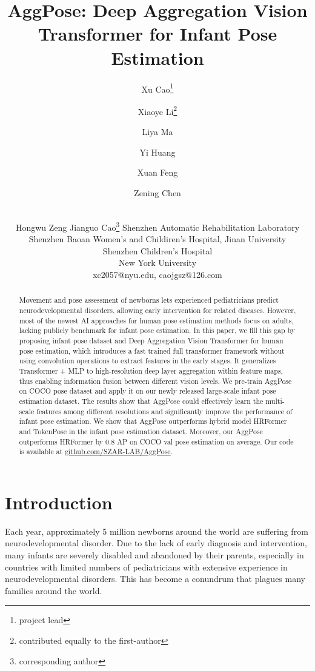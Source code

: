 \documentclass{article}
\title{AggPose: Deep Aggregation Vision Transformer for Infant Pose Estimation}
\author{
Xu Cao\thanks{project lead}
\and
Xiaoye Li\thanks{contributed equally to the first-author} \and
Liya Ma \and
Yi Huang \and
Xuan Feng \and
Zening Chen \and \\
Hongwu Zeng \And
Jianguo Cao\thanks{corresponding author}
\affiliations
Shenzhen Automatic Rehabilitation Laboratory \\
Shenzhen Baoan Women's and Childiren's Hospital, Jinan University \\
Shenzhen Children’s Hospital \\
New York University \\
\emails
xc2057@nyu.edu, caojgsz@126.com
}
\begin{document}
\maketitle

\begin{abstract}
 Movement and pose assessment of newborns lets experienced pediatricians predict neurodevelopmental disorders, allowing early intervention for related diseases. However, most of the newest AI approaches for human pose estimation methods focus on adults, lacking publicly benchmark for infant pose estimation. In this paper, we fill this gap by proposing infant pose dataset and Deep Aggregation Vision Transformer for human pose estimation, which introduces a fast trained full transformer framework without using convolution operations to extract features in the early stages. It generalizes Transformer + MLP to high-resolution deep layer aggregation within feature maps, thus enabling information fusion between different vision levels. We pre-train AggPose on COCO pose dataset and apply it on our newly released large-scale infant pose estimation dataset. The results show that AggPose could effectively learn the multi-scale features among different resolutions and significantly improve the performance of infant pose estimation. We show that AggPose outperforms hybrid model HRFormer and TokenPose in the infant pose estimation dataset. Moreover, our AggPose outperforms HRFormer by 0.8 AP on COCO val pose estimation on average.  Our code is available at \href{https://github.com/SZAR-LAB/AggPose}{github.com/SZAR-LAB/AggPose}.
\end{abstract}





\section{Introduction}

Each year, approximately 5 million newborns around the world are suffering from neurodevelopmental disorder. Due to the lack of early diagnosis and intervention, many infants are severely disabled and abandoned by their parents, especially in countries with limited numbers of pediatricians with extensive experience in neurodevelopmental disorders. This has become a conundrum that plagues many families around the world. 
\end{document}
